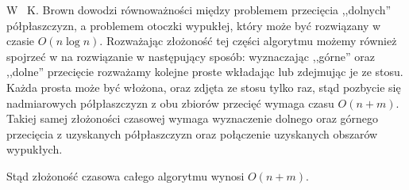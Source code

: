 W~\cite{Brown78} K. Brown dowodzi równoważności między problemem
przecięcia ,,dolnych'' półpłaszczyzn, a problemem otoczki wypukłej,
który może być rozwiązany w czasie $O(n \log n)$. Rozważając złożoność
tej części algorytmu możemy również spojrzeć w na rozwiązanie w
następujący sposób: wyznaczając ,,górne'' oraz ,,dolne'' przecięcie
rozważamy kolejne proste wkładając lub zdejmując je ze stosu. Każda
prosta może być włożona, oraz zdjęta ze stosu tylko raz, stąd pozbycie
się nadmiarowych półpłaszczyzn z obu zbiorów przecięć wymaga czasu
$O(n + m)$. Takiej samej złożoności czasowej wymaga wyznaczenie
dolnego oraz górnego przecięcia z uzyskanych półpłaszczyzn oraz
połączenie uzyskanych obszarów wypukłych.

Stąd złożoność czasowa całego algorytmu wynosi $O(n + m)$.

